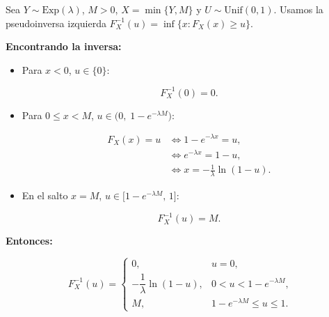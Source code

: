 \documentclass[10pt,a4paper]{article}
\begin{document}
    Sea \(Y\sim\mathrm{Exp}(\lambda)\), \(M>0\), \(X=\min\{Y,M\}\) y
\(U\sim\mathrm{Unif}(0,1)\). Usamos la pseudoinversa izquierda
\(F_X^{-1}(u)=\inf\{x:F_X(x)\ge u\}\).

\textbf{Encontrando la inversa:}

\begin{itemize}
\item
  Para \(x<0\), \(u\in\{0\}\):

  \[
  F_X^{-1}(0)=0.
  \]
\item
  Para \(0\le x<M\), \(u\in\big(0,\;1-e^{-\lambda M}\big)\):

  \[
  \begin{aligned}
  F_X(x)=u 
  &\iff 1-e^{-\lambda x}=u,\\
  &\iff e^{-\lambda x}=1-u,\\
  &\iff x=-\frac{1}{\lambda}\ln(1-u).
  \end{aligned}
  \]
\item
  En el salto \(x=M\), \(u\in\big[1-e^{-\lambda M},\,1\big]\):

  \[
  F_X^{-1}(u)=M.
  \]
\end{itemize}

\textbf{Entonces:}

\[
F_X^{-1}(u)=
\begin{cases}
0, & u=0,\\[6pt]
-\dfrac{1}{\lambda}\ln(1-u), & 0<u<1-e^{-\lambda M},\\[10pt]
M, & 1-e^{-\lambda M}\le u\le 1.
\end{cases}
\]
\end{document}
